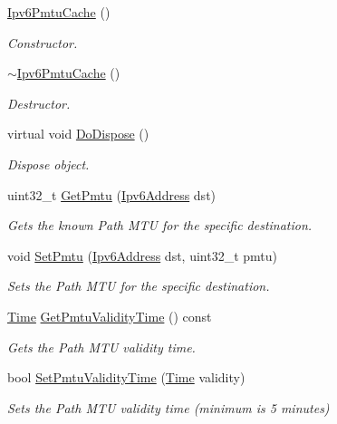 \begin{DoxyCompactItemize}
\item 
\hyperlink{classns3_1_1Ipv6PmtuCache_a63abb5eb22c149f2d20a56c3b5b3461a}{Ipv6\+Pmtu\+Cache} ()
\begin{DoxyCompactList}\small\item\em Constructor. \end{DoxyCompactList}\item 
\hyperlink{classns3_1_1Ipv6PmtuCache_a9133b35ccbc6cc9fa7477c102c096569}{$\sim$\+Ipv6\+Pmtu\+Cache} ()
\begin{DoxyCompactList}\small\item\em Destructor. \end{DoxyCompactList}\item 
virtual void \hyperlink{classns3_1_1Ipv6PmtuCache_ae4d063dd6e96df907f4eb956a47ce119}{Do\+Dispose} ()
\begin{DoxyCompactList}\small\item\em Dispose object. \end{DoxyCompactList}\item 
uint32\+\_\+t \hyperlink{classns3_1_1Ipv6PmtuCache_ad87321e965363a3898cdb340a1602b3e}{Get\+Pmtu} (\hyperlink{classns3_1_1Ipv6Address}{Ipv6\+Address} dst)
\begin{DoxyCompactList}\small\item\em Gets the known Path M\+TU for the specific destination. \end{DoxyCompactList}\item 
void \hyperlink{classns3_1_1Ipv6PmtuCache_af4a1d20727ca7665c68aed0e3ce7c2e1}{Set\+Pmtu} (\hyperlink{classns3_1_1Ipv6Address}{Ipv6\+Address} dst, uint32\+\_\+t pmtu)
\begin{DoxyCompactList}\small\item\em Sets the Path M\+TU for the specific destination. \end{DoxyCompactList}\item 
\hyperlink{classns3_1_1Time}{Time} \hyperlink{classns3_1_1Ipv6PmtuCache_ad2e4eb5240aa039ae1a364a373358b32}{Get\+Pmtu\+Validity\+Time} () const 
\begin{DoxyCompactList}\small\item\em Gets the Path M\+TU validity time. \end{DoxyCompactList}\item 
bool \hyperlink{classns3_1_1Ipv6PmtuCache_ae7a392647d099920eb544cbf22884889}{Set\+Pmtu\+Validity\+Time} (\hyperlink{classns3_1_1Time}{Time} validity)
\begin{DoxyCompactList}\small\item\em Sets the Path M\+TU validity time (minimum is 5 minutes) \end{DoxyCompactList}\end{DoxyCompactItemize}
